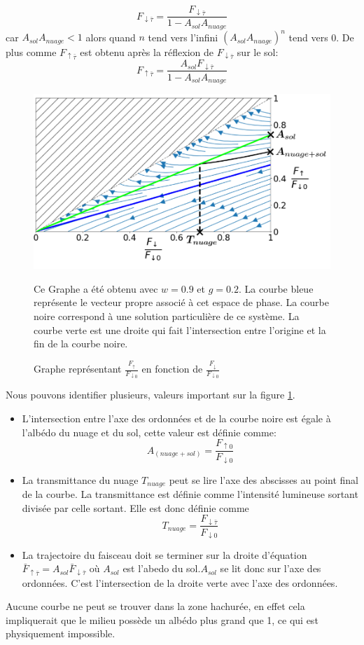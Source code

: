 \documentclass[12pt]{article}
\begin{document}
\begin{equation}
    F_{\downarrow\bar{\tau}}=\frac{F_{\downarrow\bar{\tau}}}{1-A_{sol}A_{nuage}}
\end{equation}
car $A_{sol}A_{nuage}<1$ alors quand $n$ tend vers l'infini $(A_{sol}A_{nuage})^n$ tend vers 0. De plus comme $F_{\uparrow\bar{\tau}}$ est obtenu après la réflexion de $F_{\downarrow\bar{\tau}}$ sur le sol:
\begin{equation}
     F_{\uparrow\bar{\tau}}=\frac{A_{sol}F_{\downarrow\bar{\tau}}}{1-A_{sol}A_{nuage}}
\end{equation}
\begin{figure}[H]
    \centering
    \includegraphics[width=0.7 \textwidth]{Graphe/Albedo Nuage.png}
    \caption{Graphe représentant $\frac{F_{\uparrow}}{F_{\downarrow0}}$ en fonction de $\frac{F_{\downarrow}}{F_{\downarrow0}}$}
    \label{fig:graphnuage}
     \justifying \noindent
    Ce Graphe a été obtenu avec $w=0.9$ et $g=0.2$. La courbe bleue représente le vecteur propre associé à cet espace de phase. La courbe noire correspond à une solution particulière de ce système. La courbe verte est une droite qui fait l'intersection entre l'origine et la fin de la courbe noire.
\end{figure}
Nous pouvons identifier plusieurs, valeurs important sur la figure \ref{fig:graphnuage}. \begin{itemize}
\item L'intersection entre l'axe des ordonnées et de la courbe noire est égale à l'albédo du nuage et du sol, cette valeur est définie comme:
\begin{equation}
    A_{(nuage+sol)}=\frac{F_{\uparrow0}}{F_{\downarrow0}}
\end{equation}
\item La transmittance du nuage $T_{nuage}$ peut se lire l'axe des abscisses au point final de la courbe. La transmittance est définie comme l'intensité lumineuse sortant divisée par celle sortant. Elle est donc définie comme
\begin{equation}
    T_{nuage}=\frac{F_{\downarrow\bar{\tau}}}{F_{\downarrow0}}
\end{equation}
\item La trajectoire du faisceau doit se terminer sur la droite d'équation $\bar{F}_{\uparrow \bar{\tau}}=A_{sol}\bar{F}_{\downarrow \bar{\tau}} $ où $A_{sol}$ est l'abedo du sol.$A_{sol}$ se lit donc sur l'axe des ordonnées. C'est l'intersection de la droite verte avec l'axe des ordonnées.
\end{itemize}
Aucune courbe ne peut se trouver dans la zone hachurée, en effet cela impliquerait que le milieu possède un albédo plus grand que 1, ce qui est physiquement impossible. 
\end{document}
